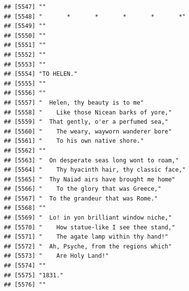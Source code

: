 \documentclass{article}\usepackage[]{graphicx}\usepackage[]{color}
\makeatletter
\newenvironment{kframe}{%
 \def\at@end@of@kframe{}%
 \ifinner\ifhmode%
  \def\at@end@of@kframe{\end{minipage}}%
  \begin{minipage}{\columnwidth}%
 \fi\fi%
 \def\FrameCommand##1{\hskip\@totalleftmargin \hskip-\fboxsep
 \colorbox{shadecolor}{##1}\hskip-\fboxsep
     \hskip-\linewidth \hskip-\@totalleftmargin \hskip\columnwidth}%
 \MakeFramed {\advance\hsize-\width
   \@totalleftmargin\z@ \linewidth\hsize
   \@setminipage}}%
 {\par\unskip\endMakeFramed%
 \at@end@of@kframe}
\newenvironment{knitrout}{}{} %
\makeatother
\begin{document}
\begin{knitrout}
\begin{kframe}
\begin{verbatim}
## [5547] ""                                                                            
## [5548] "       *       *       *       *       *"                                    
## [5549] ""                                                                            
## [5550] ""                                                                            
## [5551] ""                                                                            
## [5552] ""                                                                            
## [5553] ""                                                                            
## [5554] "TO HELEN."                                                                   
## [5555] ""                                                                            
## [5556] ""                                                                            
## [5557] "  Helen, thy beauty is to me"                                                
## [5558] "    Like those Nicean barks of yore,"                                        
## [5559] "  That gently, o'er a perfumed sea,"                                         
## [5560] "    The weary, wayworn wanderer bore"                                        
## [5561] "    To his own native shore."                                                
## [5562] ""                                                                            
## [5563] "  On desperate seas long wont to roam,"                                      
## [5564] "    Thy hyacinth hair, thy classic face,"                                    
## [5565] "  Thy Naiad airs have brought me home"                                       
## [5566] "    To the glory that was Greece,"                                           
## [5567] "  To the grandeur that was Rome."                                            
## [5568] ""                                                                            
## [5569] "  Lo! in yon brilliant window niche,"                                        
## [5570] "    How statue-like I see thee stand,"                                       
## [5571] "    The agate lamp within thy hand!"                                         
## [5572] "  Ah, Psyche, from the regions which"                                        
## [5573] "    Are Holy Land!"                                                          
## [5574] ""                                                                            
## [5575] "1831."                                                                       
## [5576] ""                                                                            

\end{verbatim}
\end{kframe}
\end{knitrout}
\end{document}
